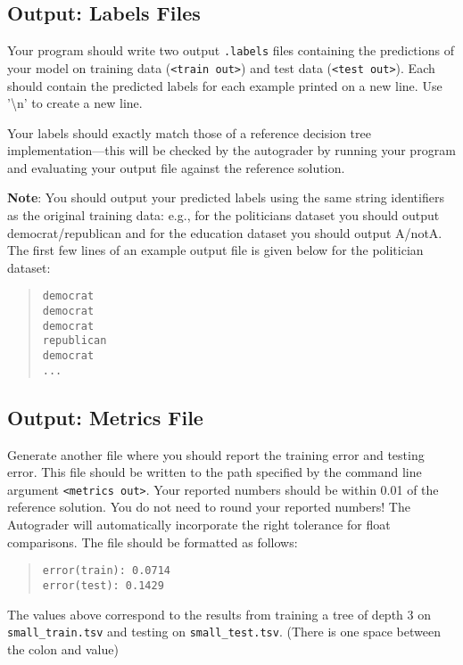 \documentclass[11pt,addpoints,answers]{exam}
\begin{document}
\subsection{Output: Labels Files}
\label{sec:labels}

Your program should write two output \lstinline{.labels} files containing the predictions of your model on training data (\lstinline{<train out>}) and test data (\lstinline{<test out>}). Each should contain the predicted labels for each example printed on a new line. Use '\textbackslash n' to create a new line.

Your labels should exactly match those of a reference decision tree implementation---this will be checked by the autograder by running your program and evaluating your output file against the reference solution.

\textbf{Note}: You should output your predicted labels using the same string identifiers as the original training data: e.g., for the politicians dataset you should output democrat/republican and for the education dataset you should output A/notA.
%
The first few lines of an example output file is given below for the politician dataset:
\begin{quote}
\begin{verbatim}
democrat
democrat
democrat
republican
democrat
...
\end{verbatim}
\end{quote}

\subsection{Output: Metrics File}
\label{sec:metrics}

Generate another file where you should report the training error and testing error. This file should be written to the path specified by the command line argument \lstinline{<metrics out>}. Your reported numbers should be within 0.01 of the reference solution. You do not need to round your reported numbers! The Autograder will automatically incorporate the right tolerance for float comparisons. The file should be formatted as follows:

\begin{quote}
\begin{verbatim}
error(train): 0.0714
error(test): 0.1429
\end{verbatim}
\end{quote}

The values above correspond to the results from training a tree of depth 3 on \texttt{small\_train.tsv} and testing on \texttt{small\_test.tsv}. (There is one space between the colon and value)
\end{document}
